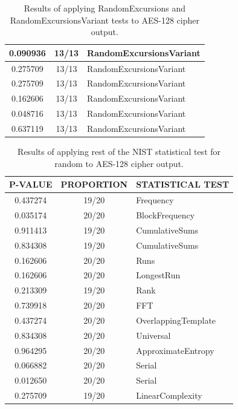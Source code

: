 \documentclass[conference]{IEEEtran}
\begin{document}
\begin{center}
\begin{table}[H]
\begin{tabular}{|c|c|l|}
0.090936         & 13/13               & RandomExcursionsVariant   \\ \hline
0.275709         & 13/13               & RandomExcursionsVariant   \\ \hline
0.275709         & 13/13               & RandomExcursionsVariant   \\ \hline
0.162606         & 13/13               & RandomExcursionsVariant   \\ \hline
0.048716         & 13/13               & RandomExcursionsVariant   \\ \hline
0.637119         & 13/13               & RandomExcursionsVariant   \\ \hline
\end{tabular}
\caption{Results of applying RandomExcursions and RandomExcursionsVariant tests to AES-128 cipher output.}
\label{nistresults2}
\end{table}
\end{center}

\begin{center}
\begin{table}[H]
\renewcommand{\arraystretch}{1.5}
\centering
\begin{tabular}{|c|c|l|}
\hline
\textbf{P-VALUE} & \textbf{PROPORTION} & \textbf{STATISTICAL TEST} \\ \hline
0.437274         & 19/20               & Frequency                 \\ \hline
0.035174         & 20/20               & BlockFrequency            \\ \hline
0.911413         & 19/20               & CumulativeSums            \\ \hline
0.834308         & 19/20               & CumulativeSums            \\ \hline
0.162606         & 20/20               & Runs                      \\ \hline
0.162606         & 20/20               & LongestRun                \\ \hline
0.213309         & 19/20               & Rank                      \\ \hline
0.739918         & 20/20               & FFT                       \\ \hline
0.437274         & 20/20               & OverlappingTemplate       \\ \hline
0.834308         & 20/20               & Universal                 \\ \hline
0.964295         & 20/20               & ApproximateEntropy        \\ \hline
0.066882         & 20/20               & Serial                    \\ \hline
0.012650         & 20/20               & Serial                    \\ \hline
0.275709         & 19/20               & LinearComplexity          \\ \hline
\end{tabular}
\caption{Results of applying rest of the NIST statistical test for random to AES-128 cipher output.}
\label{nistresults3}
\end{table}
\end{center}
\end{document}
